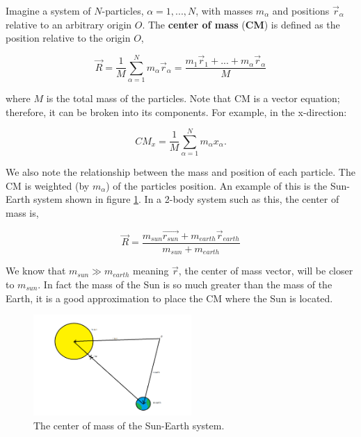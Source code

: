 
Imagine a system of $N$-particles, $\alpha = 1, ... , N$, with masses $m_\alpha$ and positions $\vec{r}_\alpha$ relative to an arbitrary origin $O$. The {\bfseries center of mass} ({\bfseries CM}) is defined as the position relative to the origin $O$,

\begin{equation*}
    \vec{R} = \frac{1}{M} \sum^{N}_{\alpha = 1} m_\alpha \vec{r}_\alpha = \frac{m_1 \vec{r}_1 + ... + m_\alpha \vec{r}_\alpha}{M}
\end{equation*}

\noindent where $M$ is the total mass of the particles. Note that CM is a vector equation; therefore, it can be broken into its components. For example, in the x-direction:

\begin{equation*}
    CM_x = \frac{1}{M} \sum^{N}_{\alpha = 1} m_\alpha x_\alpha.
\end{equation*}

We also note the relationship between the mass and position of each particle. The CM is weighted (by $m_\alpha$) of the particles position. An example of this is the Sun-Earth system shown in figure \ref{fig:cm-sun-earth}. In a 2-body system such as this, the center of mass is,

\begin{equation*}
    \vec{R} = \frac{m_{sun} \vec{r_{sun}} + m_{earth} \vec{r}_{earth}}{m_{sun} + m_{earth}}
\end{equation*}

We know that $m_{sun} \gg m_{earth}$ meaning $\vec{r}$, the center of mass vector, will be closer to $m_{sun}$. In fact the mass of the Sun is so much greater than the mass of the Earth, it is a good approximation to place the CM where the Sun is located.

\begin{figure}[h]
    \centering
    \includegraphics[width=6cm]{Classical_Mechanics/2.5-center-of-mass/cm-sun-earth.png}
    \caption{The center of mass of the Sun-Earth system.}
    \label{fig:cm-sun-earth}
\end{figure}

